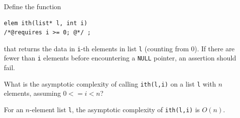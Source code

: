 \begin{flex}
\begin{exercise}
\label{ex:linked-list_ith}
  Define the function
\begin{lstlisting}
elem ith(list* l, int i)
/*@requires i >= 0; @*/ ;
\end{lstlisting}
that returns the data in \lstinline'i'-th elements in list
\lstinline'l' (counting from 0).  If there are fewer than
\lstinline'i' elements before encountering a \lstinline'NULL' pointer,
an assertion should fail.

What is the asymptotic complexity of calling \lstinline'ith(l,i)' on a
list \lstinline'l' with $n$ elements, assuming $0 <= i < n$?
\end{exercise}


\begin{solution}
\label{ex:linked-list_ith-solved}
\par\medskip\noindent\usebox{\lstbox}\par
For an $n$-element list \lstinline'l', the asymptotic complexity of
\lstinline'ith(l,i)' is $O(n)$.
\end{solution}
\end{flex}


